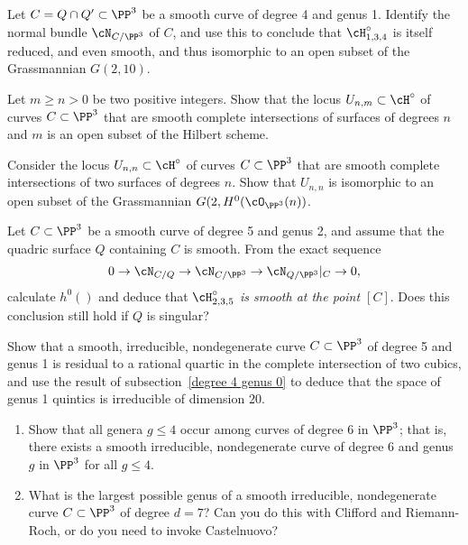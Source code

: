 \begin{exercise}\label{hilb 1,3,4}
Let $C = Q \cap Q' \subset \PP^3$ be a smooth curve of degree 4 and genus 1. Identify the normal bundle $\cN_{C/\PP^3}$ of $C$, and use this to conclude that $\cH^\circ_{1,3,4}$ is itself reduced, and even smooth, and thus isomorphic to an open subset of the Grassmannian $G(2,10)$.
\end{exercise}

\begin{exercise}\label{complete intersection open}
Let $m \geq n >0$ be two positive integers. Show that the locus $U_{n,m} \subset \cH^\circ$ of curves $C \subset \PP^3$ that are smooth complete intersections of surfaces of degrees $n$ and $m$ is an open subset of the Hilbert scheme.
\end{exercise}

\begin{exercise}\label{first complete intersection exercise}
Consider  the locus $U_{n,n} \subset \cH^\circ$ of curves $C \subset \PP^3$ that are smooth complete intersections of two surfaces of degrees $n$. Show that $U_{n,n}$ 
is isomorphic to an open subset of the Grassmannian $G(2, H^0(\cO_{\PP^3}(n))$.
\end{exercise}

\begin{exercise}
Let $C \subset \PP^3$ be a smooth curve of degree 5 and genus 2, and assume that the quadric surface $Q$ containing $C$ is smooth. From the exact sequence
$$
0 \to \cN_{C/Q} \to  \cN_{C/\PP^3} \to  \cN_{Q/\PP^3}|_C \to 0,
$$
calculate $h^0()$ and deduce that \emph{$\cH^\circ_{2,3,5}$ is smooth at the point $[C]$}. Does  this conclusion still hold if $Q$ is singular?
\end{exercise}

\begin{exercise}\label{quintics genus 1}
Show that a smooth, irreducible, nondegenerate curve $C \subset \PP^3$ of degree 5 and genus 1 is residual to a rational quartic in the complete intersection of two cubics, and use the result of subsection~\ref{degree 4 genus 0} to deduce that the space of genus 1 quintics is irreducible of dimension 20.
\end{exercise}

\begin{exercise}
\begin{enumerate}
\item Show that all genera $g \leq 4$  occur among curves of degree 6 in $\PP^3$; that is, there exists a smooth irreducible, nondegenerate curve of degree 6 and genus $g$ in $\PP^3$ for all $g \leq 4$.
\item What is the largest possible genus of a smooth irreducible, nondegenerate curve $C \subset \PP^3$ of degree $d=7$? Can you do this with Clifford and Riemann-Roch, or do you need to invoke Castelnuovo?
\end{enumerate}
\end{exercise}

